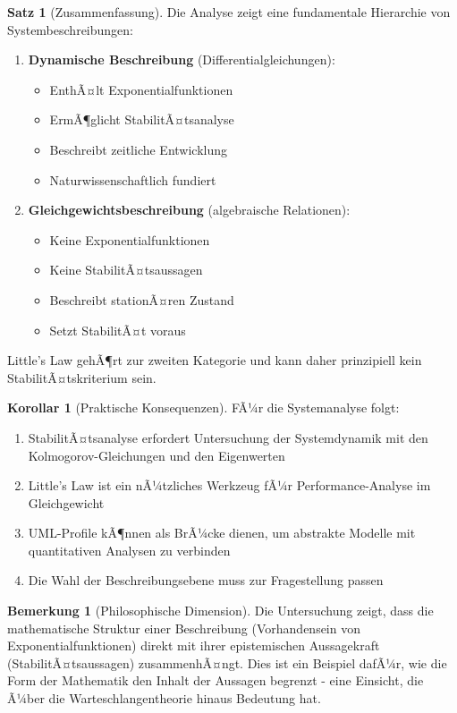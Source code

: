 ﻿\documentclass[a4paper,12pt]{report}
\theoremstyle{definition}
\newtheorem{bemerkung}{Bemerkung}[section]
\newtheorem{satz}{Satz}[section]
\newtheorem{korollar}{Korollar}[section]
\begin{document}
\begin{satz}[Zusammenfassung]
	Die Analyse zeigt eine fundamentale Hierarchie von Systembeschreibungen:
	\begin{enumerate}
		\item[-] \textbf{Dynamische Beschreibung} (Differentialgleichungen):
		\begin{itemize}
			\item[-] EnthÃ¤lt Exponentialfunktionen
			\item[-] ErmÃ¶glicht StabilitÃ¤tsanalyse
			\item[-] Beschreibt zeitliche Entwicklung
			\item[-] Naturwissenschaftlich fundiert
		\end{itemize}
		
		\item[-] \textbf{Gleichgewichtsbeschreibung} (algebraische Relationen):
		\begin{itemize}
			\item[-] Keine Exponentialfunktionen
			\item[-] Keine StabilitÃ¤tsaussagen
			\item[-] Beschreibt stationÃ¤ren Zustand
			\item[-] Setzt StabilitÃ¤t voraus
		\end{itemize}
	\end{enumerate}
	
	Little's Law gehÃ¶rt zur zweiten Kategorie und kann daher prinzipiell kein StabilitÃ¤tskriterium sein.
\end{satz}

\begin{korollar}[Praktische Konsequenzen]
	FÃ¼r die Systemanalyse folgt:
	\begin{enumerate}
		\item[-] StabilitÃ¤tsanalyse erfordert Untersuchung der Systemdynamik mit den Kolmogorov-Gleichun\-gen und den Eigenwerten
		\item[-] Little's Law ist ein nÃ¼tzliches Werkzeug fÃ¼r Performance-Analyse im Gleichgewicht
		\item[-] UML-Profile kÃ¶nnen als BrÃ¼cke dienen, um abstrakte Modelle mit quantitativen Analysen zu verbinden
		\item[-] Die Wahl der Beschreibungsebene muss zur Fragestellung passen
	\end{enumerate}
\end{korollar}

\begin{bemerkung}[Philosophische Dimension]
	Die Untersuchung zeigt, dass die mathematische Struktur einer Beschreibung (Vorhandensein von Exponentialfunktionen) direkt mit ihrer epistemischen Aussagekraft (StabilitÃ¤tsaussagen) zusammenhÃ¤ngt. Dies ist ein Beispiel dafÃ¼r, wie die Form der Mathematik den Inhalt der Aussagen begrenzt - eine Einsicht, die Ã¼ber die Warteschlangentheorie hinaus Bedeutung hat.
\end{bemerkung}
\end{document}
